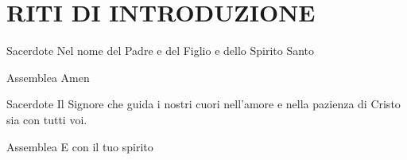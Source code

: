 \section*{RITI DI INTRODUZIONE}

\begin{dialoghi}
\item[Sacerdote] Nel nome del Padre e del Figlio e dello Spirito Santo
\item[Assemblea] Amen
\item[Sacerdote] Il Signore che guida i nostri cuori nell'amore e nella pazienza di Cristo sia con tutti voi.
\item[Assemblea] E con il tuo spirito
\end{dialoghi}
